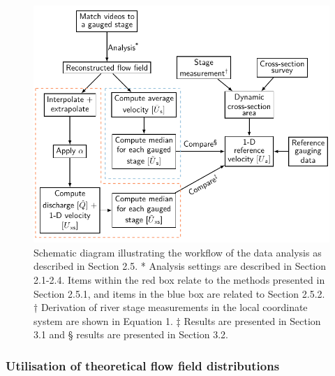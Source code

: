 \documentclass[hess, manuscript]{copernicus} %
\begin{document}
\begin{figure}[!htb]
\centering 
\includegraphics[width=12cm]{Main/Initial_submission_2024/Figures/Figure3.pdf}
\caption{Schematic diagram illustrating the workflow of the data analysis as described in Section 2.5. * Analysis settings are described in Section 2.1-2.4. Items within the red box relate to the methods presented in Section 2.5.1, and items in the blue box are related to Section 2.5.2. † Derivation of river stage measurements in the local coordinate system are shown in Equation 1. ‡ Results are presented in Section 3.1 and § results are presented in Section 3.2.}
\label{Figure3} 
\end{figure}

\FloatBarrier

\subsubsection{Utilisation of theoretical flow field distributions} 
\label{Data-driven fitting}
\end{document}
